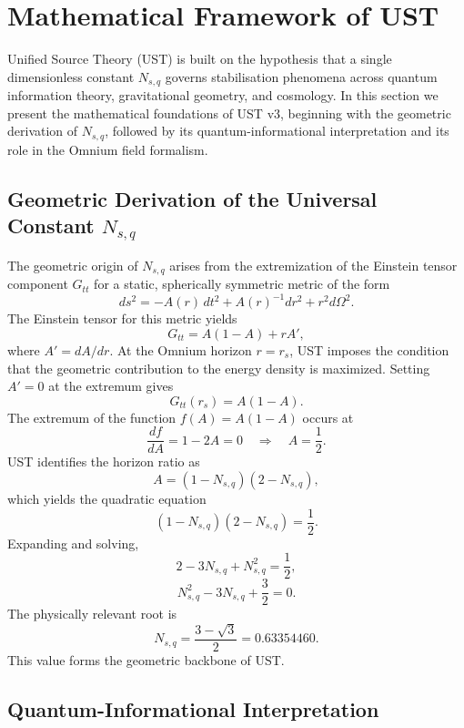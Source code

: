 \documentclass[12pt]{article}
\begin{document}

\section{Mathematical Framework of UST}

Unified Source Theory (UST) is built on the hypothesis that a single
dimensionless constant $N_{s,q}$ governs stabilisation phenomena across
quantum information theory, gravitational geometry, and cosmology. In this
section we present the mathematical foundations of UST v3, beginning with the
geometric derivation of $N_{s,q}$, followed by its quantum-informational
interpretation and its role in the Omnium field formalism.

\subsection{Geometric Derivation of the Universal Constant $N_{s,q}$}

The geometric origin of $N_{s,q}$ arises from the extremization of the
Einstein tensor component $G_{tt}$ for a static, spherically symmetric metric
of the form
\[
ds^2 = -A(r)\,dt^2 + A(r)^{-1}dr^2 + r^2 d\Omega^2.
\]
The Einstein tensor for this metric yields
\[
G_{tt} = A(1-A) + rA',
\]
where $A' = dA/dr$. At the Omnium horizon $r=r_s$, UST imposes the condition
that the geometric contribution to the energy density is maximized. Setting
$A'=0$ at the extremum gives
\[
G_{tt}(r_s) = A(1-A).
\]
The extremum of the function $f(A)=A(1-A)$ occurs at
\[
\frac{df}{dA} = 1 - 2A = 0 \quad \Rightarrow \quad A = \frac{1}{2}.
\]
UST identifies the horizon ratio as
\[
A = (1-N_{s,q})(2-N_{s,q}),
\]
which yields the quadratic equation
\[
(1-N_{s,q})(2-N_{s,q}) = \frac{1}{2}.
\]
Expanding and solving,
\[
2 - 3N_{s,q} + N_{s,q}^2 = \frac{1}{2},
\]
\[
N_{s,q}^2 - 3N_{s,q} + \frac{3}{2} = 0.
\]
The physically relevant root is
\[
N_{s,q} = \frac{3 - \sqrt{3}}{2} = 0.63354460.
\]
This value forms the geometric backbone of UST.

\subsection{Quantum-Informational Interpretation}
\end{document}
